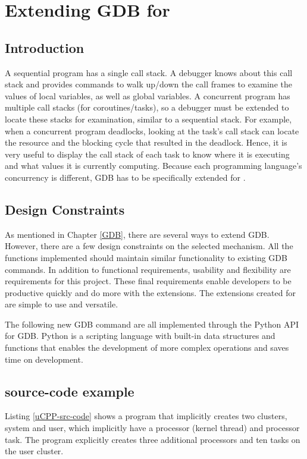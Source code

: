 \chapter{Extending GDB for \uCPP}

\section{Introduction}
A sequential program has a single call stack. A debugger knows about this call
stack and provides commands to walk up/down the call frames to examine the
values of local variables, as well as global variables. A concurrent program
has multiple call stacks (for coroutines/tasks), so a debugger must be extended
to locate these stacks for examination, similar to a sequential stack.  For
example, when a concurrent program deadlocks, looking at the task's call stack
can locate the resource and the blocking cycle that resulted in the
deadlock. Hence, it is very useful to display the call stack of each task to
know where it is executing and what values it is currently computing. Because
each programming language's concurrency is different, GDB has to be
specifically extended for \uCPP.

\section{Design Constraints}
As mentioned in Chapter \ref{GDB}, there are several ways to extend GDB. However,
there are a few design constraints on the selected mechanism. All the functions
implemented should maintain similar functionality to existing GDB commands. In addition to functional
requirements, usability and flexibility are requirements for this
project. These final requirements enable developers to be productive quickly
and do more with the extensions. The extensions created for \uCPPS are simple
to use and versatile.

The following new GDB command are all implemented through the Python API for
GDB.  Python is a scripting language with built-in data structures and
functions that enables the development of more complex operations and saves
time on development.

\section{\uCPPS source-code example}
Listing \ref{uCPP-src-code} shows a \uCPPS program that implicitly creates two
clusters, system and user, which implicitly have a processor (kernel thread)
and processor task. The program explicitly creates three additional processors
and ten tasks on the user cluster.

